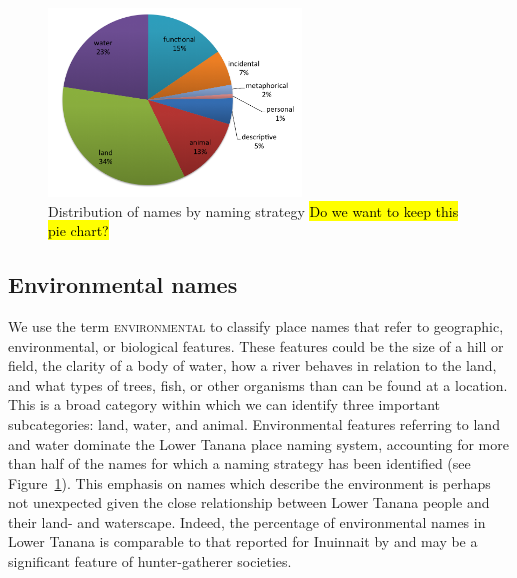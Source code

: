 \begin{figure}[hb]
  \centering
  \includegraphics[width=0.6\textwidth]{figures/holton-fig4}
  \caption{Distribution of names by naming strategy \hl{Do we want to keep this pie chart?}}
  \label{holton:fig:4}
\end{figure}



\subsection{Environmental names}
We use the term \textsc{environmental} to classify place names that refer to geographic, environmental, or biological features. These features could be the size of a hill or field, the clarity of a body of water, how a river behaves in relation to the land, and what types of trees, fish, or other organisms than can be found at a location. This is a broad category within which we can identify three important subcategories: land, water, and animal. Environmental features referring to land and water dominate the Lower Tanana place naming system, accounting for more than half of the names for which a naming strategy has been identified (see Figure~\ref{holton:fig:4}). This emphasis on names which describe the environment is perhaps not unexpected given the close relationship between Lower Tanana people and their land- and waterscape. Indeed, the percentage of environmental names in Lower Tanana is comparable to that reported for Inuinnait by \citet[138]{collignon2006} and may be a significant feature of hunter-gatherer societies.

